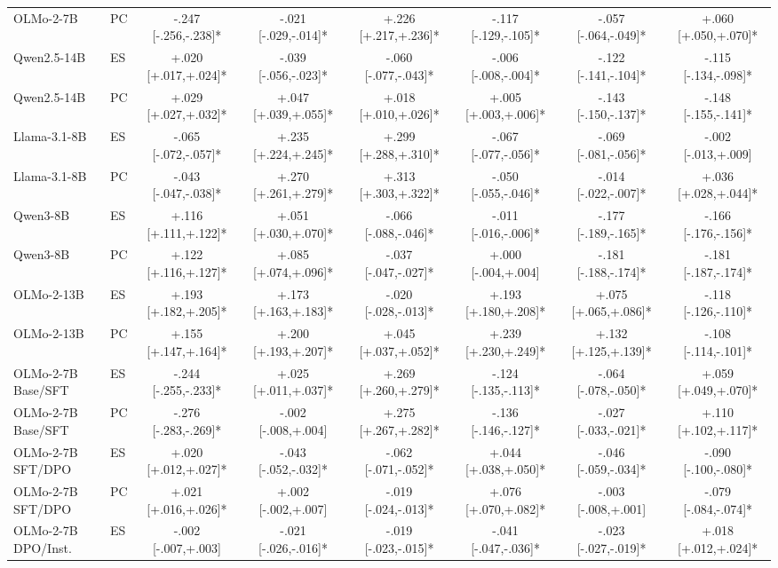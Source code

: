 \begin{table}[t]
\begin{tabular}{@{}llccc@{\hspace{8pt}}ccc@{}}
OLMo-2-7B & PC & -.247 [-.256,-.238]* & -.021 [-.029,-.014]* & +.226 [+.217,+.236]* & -.117 [-.129,-.105]* & -.057 [-.064,-.049]* & +.060 [+.050,+.070]* \\
Qwen2.5-14B & ES & +.020 [+.017,+.024]* & -.039 [-.056,-.023]* & -.060 [-.077,-.043]* & -.006 [-.008,-.004]* & -.122 [-.141,-.104]* & -.115 [-.134,-.098]* \\
Qwen2.5-14B & PC & +.029 [+.027,+.032]* & +.047 [+.039,+.055]* & +.018 [+.010,+.026]* & +.005 [+.003,+.006]* & -.143 [-.150,-.137]* & -.148 [-.155,-.141]* \\
Llama-3.1-8B & ES & -.065 [-.072,-.057]* & +.235 [+.224,+.245]* & +.299 [+.288,+.310]* & -.067 [-.077,-.056]* & -.069 [-.081,-.056]* & -.002 [-.013,+.009] \\
Llama-3.1-8B & PC & -.043 [-.047,-.038]* & +.270 [+.261,+.279]* & +.313 [+.303,+.322]* & -.050 [-.055,-.046]* & -.014 [-.022,-.007]* & +.036 [+.028,+.044]* \\
Qwen3-8B & ES & +.116 [+.111,+.122]* & +.051 [+.030,+.070]* & -.066 [-.088,-.046]* & -.011 [-.016,-.006]* & -.177 [-.189,-.165]* & -.166 [-.176,-.156]* \\
Qwen3-8B & PC & +.122 [+.116,+.127]* & +.085 [+.074,+.096]* & -.037 [-.047,-.027]* & +.000 [-.004,+.004] & -.181 [-.188,-.174]* & -.181 [-.187,-.174]* \\
OLMo-2-13B & ES & +.193 [+.182,+.205]* & +.173 [+.163,+.183]* & -.020 [-.028,-.013]* & +.193 [+.180,+.208]* & +.075 [+.065,+.086]* & -.118 [-.126,-.110]* \\
OLMo-2-13B & PC & +.155 [+.147,+.164]* & +.200 [+.193,+.207]* & +.045 [+.037,+.052]* & +.239 [+.230,+.249]* & +.132 [+.125,+.139]* & -.108 [-.114,-.101]* \\
OLMo-2-7B Base/SFT & ES & -.244 [-.255,-.233]* & +.025 [+.011,+.037]* & +.269 [+.260,+.279]* & -.124 [-.135,-.113]* & -.064 [-.078,-.050]* & +.059 [+.049,+.070]* \\
OLMo-2-7B Base/SFT & PC & -.276 [-.283,-.269]* & -.002 [-.008,+.004] & +.275 [+.267,+.282]* & -.136 [-.146,-.127]* & -.027 [-.033,-.021]* & +.110 [+.102,+.117]* \\
OLMo-2-7B SFT/DPO & ES & +.020 [+.012,+.027]* & -.043 [-.052,-.032]* & -.062 [-.071,-.052]* & +.044 [+.038,+.050]* & -.046 [-.059,-.034]* & -.090 [-.100,-.080]* \\
OLMo-2-7B SFT/DPO & PC & +.021 [+.016,+.026]* & +.002 [-.002,+.007] & -.019 [-.024,-.013]* & +.076 [+.070,+.082]* & -.003 [-.008,+.001] & -.079 [-.084,-.074]* \\
OLMo-2-7B DPO/Inst. & ES & -.002 [-.007,+.003] & -.021 [-.026,-.016]* & -.019 [-.023,-.015]* & -.041 [-.047,-.036]* & -.023 [-.027,-.019]* & +.018 [+.012,+.024]* \\

\end{tabular}
\end{table}
